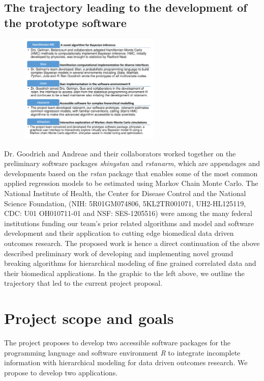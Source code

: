 \documentclass[11pt,notitlepage]{article}
\begin{document}
\subsection*{The trajectory leading to the development of the prototype software} 

\begin{figure} %
    \centering
\includegraphics[width=0.6\textwidth]{Figures/SoftwareTrajectory.pdf}
\end{figure}

Dr. Goodrich and Andreae and their collaborators worked together on the preliminary software packages \textit{shinystan} and \textit{rstanarm}, which are appendages and developments based on the \textit{rstan} package that enables some of the most common applied regression models to be estimated using Markov Chain Monte Carlo. The National Institute of Health, the Center for Disease Control and the National Science Foundation, (NIH: 5R01GM074806, 5KL2TR001071, UH2-HL125119,  CDC: U01 OH010711-01 and NSF: SES-1205516) were among the many federal institutions funding our team's prior related algorithms and model and software \cite{Stan-manual:2015} development and their application to cutting edge biomedical data driven outcomes research. The proposed work is hence a direct continuation of the above described preliminary work of developing and implementing novel ground breaking algorithms for hierarchical modeling of fine grained correlated data and their biomedical applications. In the graphic to the left above, we outline the trajectory that led to the current project proposal.


\section*{Project scope and goals }

The project proposes to develop two accessible software packages for the programming language and software environment \textit{R} to integrate incomplete information with hierarchical modeling for data driven outcomes research. We propose to develop two applications.
\end{document}
